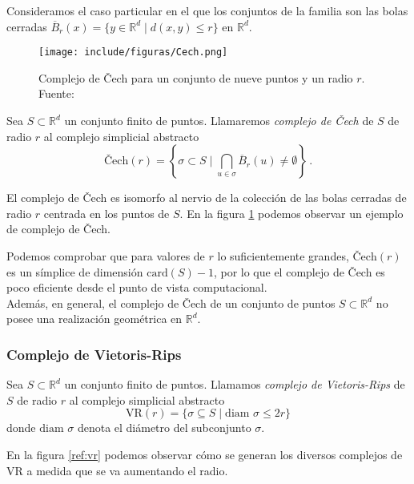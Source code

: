 Consideramos el caso particular en el que los conjuntos de la familia son las bolas cerradas $\overline{B}_r(x)= \{y\in \mathbb{R}^d \mid d(x,y) \leq r\}$ en $\mathbb{R}^d$.

\begin{figure}[!ht]
\centering
\texttt{[image: include/figuras/Cech.png]} 
\caption{Complejo de \v{C}ech para un conjunto de nueve puntos y un radio $r$. Fuente: \cite{libroEH}}
\label{ref:cech}
\end{figure}

\begin{definition}
Sea $S\subset \mathbb{R}^d$ un conjunto finito de puntos. Llamaremos \emph{complejo de \v{C}ech} de $S$ de radio $r$ al complejo simplicial abstracto
\[
\text{\v{C}ech}(r)=\left\{\sigma \subset S \mid \bigcap_{u \in \sigma} \overline{B}_r(u)\neq \emptyset \right\}\,.
\]
\end{definition}

El complejo de \v{C}ech es isomorfo al nervio de la colección de las bolas cerradas de radio $r$ centrada en los puntos de $S$. En la figura \ref{ref:cech} podemos observar un ejemplo de complejo de \v{C}ech.

Podemos comprobar {\cite[Chapter~3]{libroEH}} que para valores de $r$ lo suficientemente grandes, $\text{\v{C}ech}(r)$ es un símplice de dimensión $\text{card}(S)-1$, por lo que el complejo de \v{C}ech es poco eficiente desde el punto de vista computacional.\\
Además, en general, el complejo de \v{C}ech de un conjunto de puntos $S \subset \mathbb{R}^d$ no posee una realización geométrica en $\mathbb{R}^d$.



\subsubsection*{Complejo de Vietoris-Rips}

\begin{definition}
Sea $S \subset \mathbb{R}^d$ un conjunto finito de puntos. Llamamos \emph{complejo de Vietoris-Rips} de $S$ de radio $r$ al complejo simplicial abstracto
\[
\text{VR}(r) = \{\sigma \subseteq  S \mid \textrm{diam } \sigma \leq 2r\}
\]
donde $\textrm{diam } \sigma$ denota el diámetro del subconjunto $\sigma$.
\end{definition}

En la figura \ref{ref:vr} podemos observar cómo se generan los diversos complejos de VR a medida que se va aumentando el radio.

